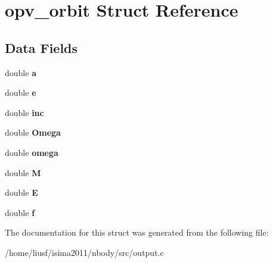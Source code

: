 \hypertarget{structopv__orbit}{
\section{opv\_\-orbit Struct Reference}
\label{structopv__orbit}
}
\subsection*{Data Fields}
\begin{DoxyCompactItemize}
\item 
\hypertarget{structopv__orbit_a5b5aa40c09e8d6215019ac18b77538d3}{
double {\bfseries a}}
\label{structopv__orbit_a5b5aa40c09e8d6215019ac18b77538d3}

\item 
\hypertarget{structopv__orbit_af433bc9d191d27e2add77932969443e1}{
double {\bfseries e}}
\label{structopv__orbit_af433bc9d191d27e2add77932969443e1}

\item 
\hypertarget{structopv__orbit_a6a1f42c9d7a92ab8100782178c75ed79}{
double {\bfseries inc}}
\label{structopv__orbit_a6a1f42c9d7a92ab8100782178c75ed79}

\item 
\hypertarget{structopv__orbit_a4e00e8c1bc3fdbf5a38066b75005b65f}{
double {\bfseries Omega}}
\label{structopv__orbit_a4e00e8c1bc3fdbf5a38066b75005b65f}

\item 
\hypertarget{structopv__orbit_a550d6082fe261c86c6e9cdaa6bf055a5}{
double {\bfseries omega}}
\label{structopv__orbit_a550d6082fe261c86c6e9cdaa6bf055a5}

\item 
\hypertarget{structopv__orbit_a507a84b62d5e61c311e1e0f57a47082f}{
double {\bfseries M}}
\label{structopv__orbit_a507a84b62d5e61c311e1e0f57a47082f}

\item 
\hypertarget{structopv__orbit_a8bab087ffbbdd9456e5f80e02d60b76f}{
double {\bfseries E}}
\label{structopv__orbit_a8bab087ffbbdd9456e5f80e02d60b76f}

\item 
\hypertarget{structopv__orbit_a3405aadb033b21f49fa25f6ca83ee155}{
double {\bfseries f}}
\label{structopv__orbit_a3405aadb033b21f49fa25f6ca83ee155}

\end{DoxyCompactItemize}


The documentation for this struct was generated from the following file:\begin{DoxyCompactItemize}
\item 
/home/liusf/isima2011/nbody/src/output.c\end{DoxyCompactItemize}
